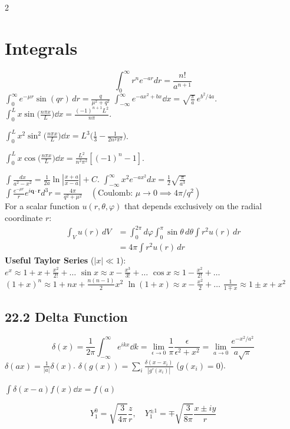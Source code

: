 \documentclass[9pt,a4paper]{article} %
\begin{document}
\begin{multicols}{2}
\section{Integrals}  
\[\int_0^\infty r^n e^{-ar} dr = \frac{n!}{a^{n+1}}\]
 $\int_0^\infty e^{-\mu r} \sin(qr)\, dr = \frac{q}{\mu^2 + q^2}$
$\int_{-\infty}^{\infty}e^{-ax^2+bx}\dd{x}=\sqrt{\frac{\pi}{a}}\,e^{b^2/4a}$.\quad
$\int_0^L x\sin\!\bigl(\frac{n\pi x}{L}\bigr)\dd{x}=\frac{(-1)^{n+1}L^2}{n\pi}$.

$\int_0^L x^2\sin^2\!\bigl(\frac{n\pi x}{L}\bigr)\dd{x}=L^3\!\bigl(\frac{1}{3}-\frac{1}{2n^2\pi^2}\bigr)$.

$\int_0^L x\cos\!\bigl(\frac{n\pi x}{L}\bigr)\dd{x}=\frac{L^2}{n^2\pi^2}[(-1)^n-1]$.

$\int \frac{dx}{a^2-x^2}=\frac{1}{2a}\ln\!\left|\frac{x+a}{x-a}\right|+C$.
$\int_{-\infty}^{\infty}x^{2}e^{-ax^2}dx=\frac{1}{2}\sqrt{\frac{\pi}{a^3}}$
\\
$\int \frac{e^{-\mu r}}{r} e^{i\mathbf{q}\cdot\mathbf{r}} d^3r = \frac{4\pi}{q^2 + \mu^2} \quad (\text{Coulomb: } \mu \to 0 \implies 4\pi/q^2)$\\
For a scalar function $u(r, \theta, \varphi)$ that depends exclusively on the radial coordinate $r$:
\begin{align*}
    \int_V u(r) \, dV &= \int_{0}^{2\pi} d\varphi \int_{0}^{\pi} \sin\theta \, d\theta \int r^2 u(r) \, dr \\
    &= 4\pi \int r^2 u(r) \, dr
\end{align*}
{ \noindent \textbf{Useful Taylor Series} ($|x| \ll 1$): \\
$e^x \approx 1 + x + \frac{x^2}{2!} + \dots$ \quad
$\sin x \approx x - \frac{x^3}{3!} + \dots$ \quad
$\cos x \approx 1 - \frac{x^2}{2!} + \dots$ \\
$(1+x)^n \approx 1 + nx + \frac{n(n-1)}{2}x^2$ \quad
$\ln(1+x) \approx x - \frac{x^2}{2} + \dots$ \quad
$\frac{1}{1 \mp x} \approx 1 \pm x + x^2$
}
\subsection{22.2 Delta Function}
\[
\delta(x)=\frac{1}{2\pi}\!\int_{-\infty}^{\infty}\!e^{ikx}\dd{k}=\lim_{\epsilon\to 0}\frac{1}{\pi}\frac{\epsilon}{\epsilon^2+x^2}=\lim_{a\to 0}\frac{e^{-x^2/a^2}}{a\sqrt{\pi}}
\]
$\delta(ax)=\frac{1}{|a|}\delta(x)$.\quad
$\delta(g(x))=\sum_i\frac{\delta(x-x_i)}{|g'(x_i)|}$ ($g(x_i)=0$).

$\int\!\delta(x-a)f(x)\dd{x}=f(a)$

\[Y_1^0 = \sqrt{\frac{3}{4\pi}} \frac{z}{r}, \quad Y_1^{\pm 1} = \mp \sqrt{\frac{3}{8\pi}} \frac{x \pm iy}{r}\]

\end{multicols}
\end{document}
